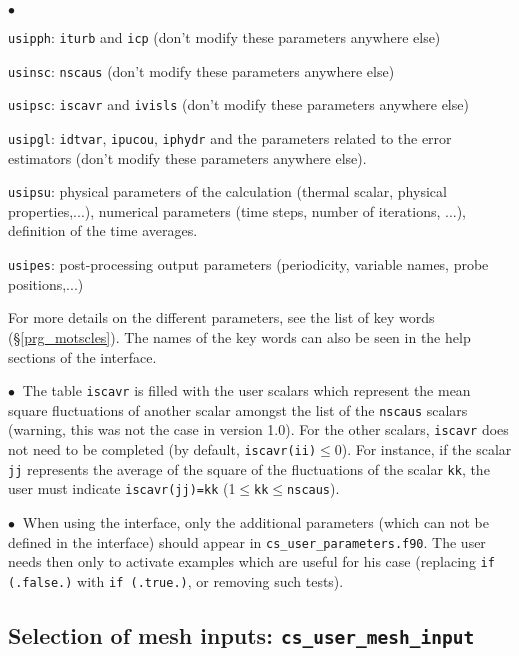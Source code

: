 {{\begin{list}{$\bullet$}{}
\item \texttt{usipph}: \texttt{iturb} and \texttt{icp} (don't modify these
      parameters anywhere else)
\item \texttt{usinsc}: \texttt{nscaus} (don't modify these parameters anywhere
      else)
\item \texttt{usipsc}: \texttt{iscavr} and \texttt{ivisls} (don't modify these
      parameters anywhere else)
\item \texttt{usipgl}: \texttt{idtvar}, \texttt{ipucou}, \texttt{iphydr} and the
      parameters related to the error estimators (don't modify these parameters
      anywhere else).
\item \texttt{usipsu}: physical parameters of the calculation (thermal scalar, physical
      properties,...), numerical parameters (time steps, number of iterations, ...),
      definition of the time averages.
\item \texttt{usipes}: post-processing output parameters (periodicity, variable names,
      probe positions,...)
\end{list}

For more details on the different parameters, see the list of key words  (\S\ref{prg_motscles}).
 The names of the key words can also be seen in the help sections of the interface.

$\bullet\ $ The table \texttt{iscavr} is filled with the user scalars which represent the mean square fluctuations of another scalar amongst the list of the \texttt{nscaus} scalars (warning, this was not the case in version 1.0). For the other scalars, \texttt{iscavr} does not need to be completed (by default,
\texttt{iscavr(ii)}$\leqslant$0). For instance, if the scalar \texttt{jj}
represents the average of the square of the fluctuations of the scalar \texttt{kk},
the user must indicate \texttt{iscavr(jj)=kk}
(1$\leqslant$\texttt{kk}$\leqslant$\texttt{nscaus}).

\noindent
$\bullet\ $ When using the interface, only the
additional parameters (which can not be defined in the interface)
should appear in \texttt{cs\_user\_parameters.f90}. The user
needs then only to activate examples which are useful for his
case (replacing \texttt{if (.false.)} with \texttt{if (.true.)},
or removing such tests).

\subsection{Selection of mesh inputs: \textmd{\texttt{cs\_user\_mesh\_input}}}

}}

